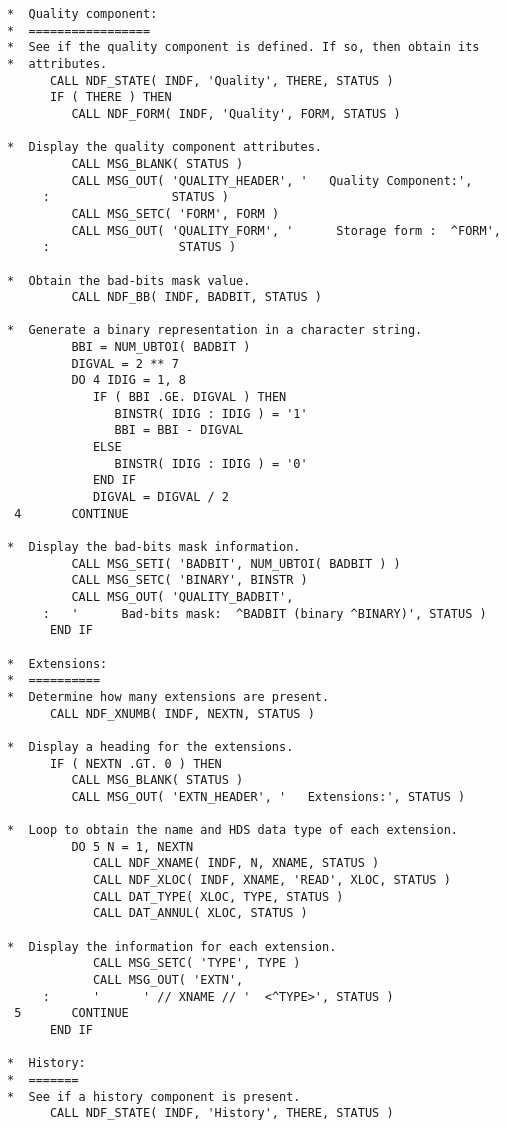 \begin{verbatim}
*  Quality component:
*  =================
*  See if the quality component is defined. If so, then obtain its
*  attributes.
      CALL NDF_STATE( INDF, 'Quality', THERE, STATUS )
      IF ( THERE ) THEN
         CALL NDF_FORM( INDF, 'Quality', FORM, STATUS )

*  Display the quality component attributes.
         CALL MSG_BLANK( STATUS )
         CALL MSG_OUT( 'QUALITY_HEADER', '   Quality Component:',
     :                 STATUS )
         CALL MSG_SETC( 'FORM', FORM )
         CALL MSG_OUT( 'QUALITY_FORM', '      Storage form :  ^FORM',
     :                  STATUS )

*  Obtain the bad-bits mask value.
         CALL NDF_BB( INDF, BADBIT, STATUS )

*  Generate a binary representation in a character string.
         BBI = NUM_UBTOI( BADBIT )
         DIGVAL = 2 ** 7
         DO 4 IDIG = 1, 8
            IF ( BBI .GE. DIGVAL ) THEN
               BINSTR( IDIG : IDIG ) = '1'
               BBI = BBI - DIGVAL
            ELSE
               BINSTR( IDIG : IDIG ) = '0'
            END IF
            DIGVAL = DIGVAL / 2
 4       CONTINUE

*  Display the bad-bits mask information.
         CALL MSG_SETI( 'BADBIT', NUM_UBTOI( BADBIT ) )
         CALL MSG_SETC( 'BINARY', BINSTR )
         CALL MSG_OUT( 'QUALITY_BADBIT',
     :   '      Bad-bits mask:  ^BADBIT (binary ^BINARY)', STATUS )
      END IF

*  Extensions:
*  ==========
*  Determine how many extensions are present.
      CALL NDF_XNUMB( INDF, NEXTN, STATUS )

*  Display a heading for the extensions.
      IF ( NEXTN .GT. 0 ) THEN
         CALL MSG_BLANK( STATUS )
         CALL MSG_OUT( 'EXTN_HEADER', '   Extensions:', STATUS )

*  Loop to obtain the name and HDS data type of each extension.
         DO 5 N = 1, NEXTN
            CALL NDF_XNAME( INDF, N, XNAME, STATUS )
            CALL NDF_XLOC( INDF, XNAME, 'READ', XLOC, STATUS )
            CALL DAT_TYPE( XLOC, TYPE, STATUS )
            CALL DAT_ANNUL( XLOC, STATUS )

*  Display the information for each extension.
            CALL MSG_SETC( 'TYPE', TYPE )
            CALL MSG_OUT( 'EXTN',
     :      '      ' // XNAME // '  <^TYPE>', STATUS )
 5       CONTINUE
      END IF

*  History:
*  =======
*  See if a history component is present.
      CALL NDF_STATE( INDF, 'History', THERE, STATUS )


\end{verbatim}
